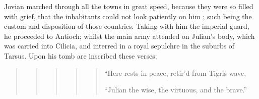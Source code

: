 Jovian marched through all the towns in great speed, because they were so filled with grief, that the inhabitants could not look patiently on him ; such being the custom and disposition of those countries. Taking with him the imperial guard, he proceeded to Antioch; whilst the main army attended on Julian's body, which was carried into Cilicia, and interred in a royal sepulchre in the suburbs of Tarsus. Upon his tomb are inscribed these verses:

\begin{quote}

\begin{quote}

\begin{quote}

\begin{quote}

\begin{quote}

``Here rests in peace, retir'd from Tigris wave, 

``Julian the wise, the virtuous, and the brave.''

\end{quote}

\end{quote}

\end{quote}

\end{quote}

\end{quote}


